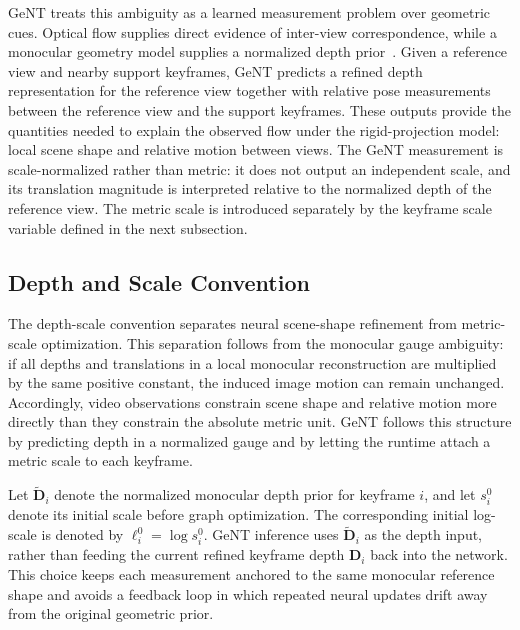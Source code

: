 GeNT treats this ambiguity as a learned measurement problem over geometric cues.
Optical flow supplies direct evidence of inter-view correspondence, while a monocular geometry model supplies a normalized depth prior~\cite{wang2025moge2}.
Given a reference view and nearby support keyframes, GeNT predicts a refined depth representation for the reference view together with relative pose measurements between the reference view and the support keyframes.
These outputs provide the quantities needed to explain the observed flow under the rigid-projection model: local scene shape and relative motion between views.
The GeNT measurement is scale-normalized rather than metric: it does not output an independent scale, and its translation magnitude is interpreted relative to the normalized depth of the reference view.
The metric scale is introduced separately by the keyframe scale variable defined in the next subsection.

\subsection{Depth and Scale Convention}
The depth-scale convention separates neural scene-shape refinement from metric-scale optimization.
This separation follows from the monocular gauge ambiguity: if all depths and translations in a local monocular reconstruction are multiplied by the same positive constant, the induced image motion can remain unchanged.
Accordingly, video observations constrain scene shape and relative motion more directly than they constrain the absolute metric unit.
GeNT follows this structure by predicting depth in a normalized gauge and by letting the runtime attach a metric scale to each keyframe.

Let $\tilde{\bm{D}}_i$ denote the normalized monocular depth prior for keyframe $i$, and let $s_i^0$ denote its initial scale before graph optimization.
The corresponding initial log-scale is denoted by $\ell_i^0=\log s_i^0$.
GeNT inference uses $\tilde{\bm{D}}_i$ as the depth input, rather than feeding the current refined keyframe depth $\bm{D}_i$ back into the network.
This choice keeps each measurement anchored to the same monocular reference shape and avoids a feedback loop in which repeated neural updates drift away from the original geometric prior.

